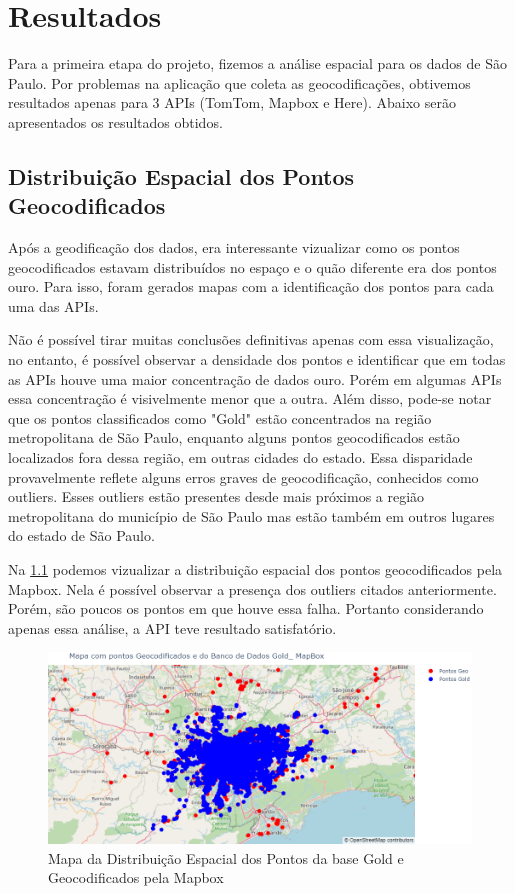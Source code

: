 \chapter{Resultados} \label{resultado}
Para a primeira etapa do projeto, fizemos a análise espacial para os dados de São Paulo. Por problemas na aplicação que coleta as geocodificações, obtivemos resultados apenas para 3 APIs (TomTom, Mapbox e Here). Abaixo serão apresentados os resultados obtidos.

\section{Distribuição Espacial dos Pontos Geocodificados}
Após a geodificação dos dados, era interessante vizualizar como os pontos geocodificados estavam distribuídos no espaço e o quão diferente era dos pontos ouro. Para isso, foram gerados mapas com a identificação dos pontos para cada uma das APIs.

Não é possível tirar muitas conclusões definitivas apenas com essa visualização, no entanto, é possível observar a densidade dos pontos e identificar que em todas as APIs houve uma maior concentração de dados ouro. Porém em algumas APIs essa concentração é visivelmente menor que a outra. Além disso, pode-se notar que os pontos classificados como "Gold" estão concentrados na região metropolitana de São Paulo, enquanto alguns pontos geocodificados estão localizados fora dessa região, em outras cidades do estado. Essa disparidade provavelmente reflete alguns erros graves de geocodificação, conhecidos como outliers. Esses outliers estão presentes desde mais próximos a região metropolitana do município de São Paulo mas estão também em outros lugares do estado de São Paulo.

Na \ref{fig:mapapontos1} podemos vizualizar a distribuição espacial dos pontos geocodificados pela Mapbox. Nela é possível observar a presença dos outliers citados anteriormente. Porém, são poucos os pontos em que houve essa falha. Portanto considerando apenas essa análise, a API teve resultado satisfatório.

\begin{figure}[h]
  \centering
  \includegraphics[width=\textwidth]{Figuras/mapapontos1.png}
  \caption{Mapa da Distribuição Espacial dos Pontos da base Gold e Geocodificados pela Mapbox}
  \label{fig:mapapontos1}
\end{figure}

